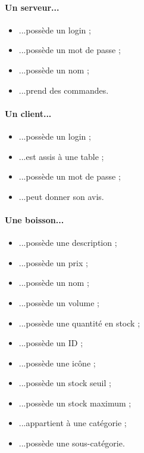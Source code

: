 

\begin{minipage}[l]{0.5\textwidth}
	\paragraph{Un serveur...}
	\begin{itemize}
		\item ...possède un login ;
		\item ...possède un mot de passe ;
		\item ...possède un nom ;
		\item ...prend des commandes.
	\end{itemize}

	\paragraph{Un client...}
	\begin{itemize}
		\item ...possède un login ;
		\item ...est assis à une table ;
		\item ...possède un mot de passe ;
		\item ...peut donner son avis.
	\end{itemize}

	\paragraph{Une boisson...}
	\begin{itemize}
		\item ...possède une description ;
		\item ...possède un prix ;
		\item ...possède un nom ;
		\item ...possède un volume ;
		\item ...possède une quantité en stock ;
		\item ...possède un ID ;
		\item ...possède une icône ;
		\item ...possède un stock seuil ;
		\item ...possède un stock maximum ;
		\item ...appartient à une catégorie ;
		\item ...possède une sous-catégorie.
	\end{itemize}
\end{minipage}
